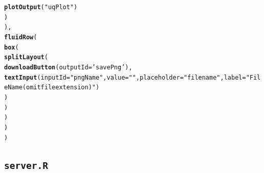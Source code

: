 \documentclass[11pt]{asaproc}\usepackage[]{graphicx}\usepackage[]{color}
\makeatletter
\newcommand{\hlstr}[1]{\textcolor[rgb]{0.192,0.494,0.8}{#1}}%
\newcommand{\hlstd}[1]{\textcolor[rgb]{0.345,0.345,0.345}{#1}}%
\newcommand{\hlkwc}[1]{\textcolor[rgb]{0.333,0.667,0.333}{#1}}%
\newcommand{\hlkwd}[1]{\textcolor[rgb]{0.737,0.353,0.396}{\textbf{#1}}}%
\newenvironment{kframe}{%
 \def\at@end@of@kframe{}%
 \ifinner\ifhmode%
  \def\at@end@of@kframe{\end{minipage}}%
  \begin{minipage}{\columnwidth}%
 \fi\fi%
 \def\FrameCommand##1{\hskip\@totalleftmargin \hskip-\fboxsep
 \colorbox{shadecolor}{##1}\hskip-\fboxsep
     \hskip-\linewidth \hskip-\@totalleftmargin \hskip\columnwidth}%
 \MakeFramed {\advance\hsize-\width
   \@totalleftmargin\z@ \linewidth\hsize
   \@setminipage}}%
 {\par\unskip\endMakeFramed%
 \at@end@of@kframe}
\newenvironment{knitrout}{}{} %
\makeatother
\begin{document}
\begin{knitrout}
\begin{kframe}
\begin{alltt}
        \hlkwd{plotOutput}\hlstd{(}\hlstr{"uqPlot"}\hlstd{)}
      \hlstd{)}
    \hlstd{),}
    \hlkwd{fluidRow}\hlstd{(}
      \hlkwd{box}\hlstd{(}
        \hlkwd{splitLayout}\hlstd{(}
          \hlkwd{downloadButton}\hlstd{(}\hlkwc{outputId} \hlstd{=} \hlstr{'savePng'}\hlstd{),}
          \hlkwd{textInput}\hlstd{(}\hlkwc{inputId} \hlstd{=} \hlstr{"pngName"}\hlstd{,} \hlkwc{value} \hlstd{=} \hlstr{""}\hlstd{,} \hlkwc{placeholder} \hlstd{=} \hlstr{"file name"}\hlstd{,} \hlkwc{label} \hlstd{=} \hlstr{"File Name (omit file extension)"}\hlstd{)}
        \hlstd{)}
      \hlstd{)}
    \hlstd{)}
  \hlstd{)}
\hlstd{)}
\end{alltt}
\end{kframe}
\end{knitrout}

\subsection{{\tt server.R}}
%
\end{document}
